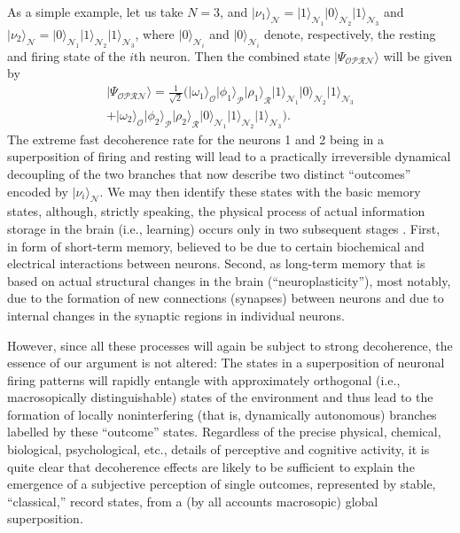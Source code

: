 \documentclass[twocolumn,aps,floatfix,amsmath,amssymb,showpacs,nofootinbib]{revtex4}
\newcommand{\ket}[1]{\ensuremath{|{#1\rangle}}}
\begin{document}
As a simple example, let us take $N=3$, and $\ket{\nu_1}_\mathcal{N} =
\ket{1}_{\mathcal{N}_1} \ket{0}_{\mathcal{N}_2}
\ket{1}_{\mathcal{N}_3}$ and $\ket{\nu_2}_\mathcal{N} =
\ket{0}_{\mathcal{N}_1} \ket{1}_{\mathcal{N}_2}
\ket{1}_{\mathcal{N}_3}$, where $\ket{0}_{\mathcal{N}_i}$ and
$\ket{0}_{\mathcal{N}_i}$ denote, respectively, the resting and firing
state of the $i$th neuron. Then the combined state
$\ket{\Psi_\mathcal{OPRN}}$ will be given by
%
\begin{multline}
\ket{\Psi_\mathcal{OPRN}} = \frac{1}{\sqrt{2}} \bigl(
\ket{\omega_1}_\mathcal{O} \ket{\phi_1}_\mathcal{P}
\ket{\rho_1}_\mathcal{R} \ket{1}_{\mathcal{N}_1} \ket{0}_{\mathcal{N}_2}
\ket{1}_{\mathcal{N}_3} 
\\ + \ket{\omega_2}_\mathcal{O} \ket{\phi_2}_\mathcal{P}
\ket{\rho_2}_\mathcal{R}  \ket{0}_{\mathcal{N}_1} \ket{1}_{\mathcal{N}_2}
\ket{1}_{\mathcal{N}_3} \bigr).
\end{multline}
%
The extreme fast decoherence rate for the neurons 1 and 2 being in a
superposition of firing and resting will lead to a practically
irreversible dynamical decoupling of the two branches that now
describe two distinct ``outcomes'' encoded by
$\ket{\nu_i}_\mathcal{N}$. We may then identify these states with the
basic memory states, although, strictly speaking, the physical process
of actual information storage in the brain (i.e., learning) occurs
only in two subsequent stages \cite{Kandel:2000:tr}. First, in form of
short-term memory, believed to be due to certain biochemical and
electrical interactions between neurons. Second, as long-term memory
that is based on actual structural changes in the brain
(``neuroplasticity''), most notably, due to the formation of new
connections (synapses) between neurons and due to internal changes in
the synaptic regions in individual neurons.

However, since all these processes will again be subject to strong
decoherence, the essence of our argument is not altered: The states in
a superposition of neuronal firing patterns will rapidly entangle with
approximately orthogonal (i.e., macrosopically distinguishable) states
of the environment and thus lead to the formation of locally
noninterfering (that is, dynamically autonomous) branches labelled by
these ``outcome'' states. Regardless of the precise physical,
chemical, biological, psychological, etc., details of perceptive and
cognitive activity, it is quite clear that decoherence effects are
likely to be sufficient to explain the emergence of a subjective
perception of single outcomes, represented by stable, ``classical,''
record states, from a (by all accounts macrosopic) global
superposition.
\end{document}
